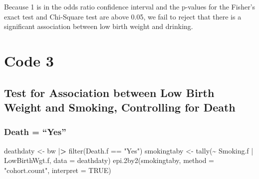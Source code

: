 \documentclass[
]{article}
\newenvironment{Shaded}{\begin{snugshade}}{\end{snugshade}}
\newcommand{\AttributeTok}[1]{\textcolor[rgb]{0.77,0.63,0.00}{#1}}
\newcommand{\ConstantTok}[1]{\textcolor[rgb]{0.00,0.00,0.00}{#1}}
\newcommand{\ErrorTok}[1]{\textcolor[rgb]{0.64,0.00,0.00}{\textbf{#1}}}
\newcommand{\FunctionTok}[1]{\textcolor[rgb]{0.00,0.00,0.00}{#1}}
\newcommand{\NormalTok}[1]{#1}
\newcommand{\OtherTok}[1]{\textcolor[rgb]{0.56,0.35,0.01}{#1}}
\newcommand{\SpecialCharTok}[1]{\textcolor[rgb]{0.00,0.00,0.00}{#1}}
\newcommand{\StringTok}[1]{\textcolor[rgb]{0.31,0.60,0.02}{#1}}
\begin{document}
Because 1 is in the odds ratio confidence interval and the p-values for
the Fisher's exact test and Chi-Square test are above 0.05, we fail to
reject that there is a significant association between low birth weight
and drinking.

\hypertarget{code-3}{%
\section{Code 3}\label{code-3}}

\hypertarget{test-for-association-between-low-birth-weight-and-smoking-controlling-for-death}{%
\subsection{Test for Association between Low Birth Weight and Smoking,
Controlling for
Death}\label{test-for-association-between-low-birth-weight-and-smoking-controlling-for-death}}

\hypertarget{death-yes}{%
\subsubsection{Death = ``Yes''}\label{death-yes}}

\begin{Shaded}
\begin{Highlighting}[]
\NormalTok{deathdaty }\OtherTok{\textless{}{-}}\NormalTok{ bw }\SpecialCharTok{|}\ErrorTok{\textgreater{}} \FunctionTok{filter}\NormalTok{(Death.f }\SpecialCharTok{==} \StringTok{"Yes"}\NormalTok{)}
\NormalTok{smokingtaby }\OtherTok{\textless{}{-}} \FunctionTok{tally}\NormalTok{(}\SpecialCharTok{\textasciitilde{}}\NormalTok{ Smoking.f }\SpecialCharTok{|}\NormalTok{ LowBirthWgt.f, }\AttributeTok{data =}\NormalTok{ deathdaty)}
\FunctionTok{epi.2by2}\NormalTok{(smokingtaby, }\AttributeTok{method =} \StringTok{"cohort.count"}\NormalTok{, }\AttributeTok{interpret =} \ConstantTok{TRUE}\NormalTok{)}
\end{Highlighting}
\end{Shaded}
\end{document}
